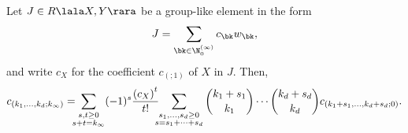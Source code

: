 \begin{Theorem}
\label{LeMuFu}
Let $J\in R\lala X,Y\rara$ be a group-like element in the form
$$
J=\sum_{\bk\in\N_0^{(\infty)}} c_\bk w_\bk,
$$
and write $c_X$ for the coefficient $c_{(;1)}$ of $X$ in $J$. 
Then,
$$
c_{(k_1,\dots,k_d;k_\infty)}= \hspace{-0.2cm} \sum_{\substack{s,t\ge 0 \\ s+t=k_\infty}}
(-1)^s
\frac{{(c_X)}^t}{t!}
\hspace{-0.2cm} \sum_{\substack{ s_1,\dots,s_d\ge 0 \\ s=s_1+\dots+s_d}}
\binom{k_1+s_1}{k_1}\cdots \binom{k_d+s_d}{k_d}
c_{(k_1+s_1,\dots,k_d+s_d;0)}.
$$
\end{Theorem}
